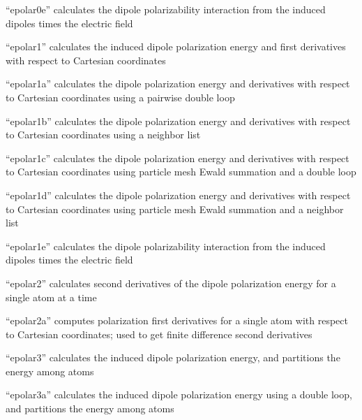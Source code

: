 \documentclass[letterpaper,11pt,english]{sphinxmanual}
\begin{document}
“epolar0e” calculates the dipole polarizability interaction
from the induced dipoles times the electric field


“epolar1” calculates the induced dipole polarization energy
and first derivatives with respect to Cartesian coordinates


“epolar1a” calculates the dipole polarization energy and
derivatives with respect to Cartesian coordinates using a
pairwise double loop


“epolar1b” calculates the dipole polarization energy and
derivatives with respect to Cartesian coordinates using a
neighbor list


“epolar1c” calculates the dipole polarization energy and
derivatives with respect to Cartesian coordinates using
particle mesh Ewald summation and a double loop


“epolar1d” calculates the dipole polarization energy and
derivatives with respect to Cartesian coordinates using
particle mesh Ewald summation and a neighbor list


“epolar1e” calculates the dipole polarizability interaction
from the induced dipoles times the electric field


“epolar2” calculates second derivatives of the dipole polarization
energy for a single atom at a time


“epolar2a” computes polarization first derivatives for a single
atom with respect to Cartesian coordinates; used to get finite
difference second derivatives


“epolar3” calculates the induced dipole polarization energy,
and partitions the energy among atoms


“epolar3a” calculates the induced dipole polarization energy
using a double loop, and partitions the energy among atoms
\end{document}
